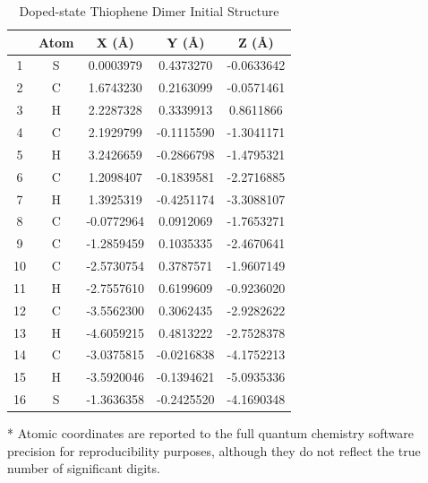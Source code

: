\begin{table}[hbt!]\centering
\caption{Doped-state Thiophene Dimer Initial Structure}
\renewcommand{\arraystretch}{1.5}
\begin{threeparttable}
\begin{tabular}{ccccc}\toprule
{} & {Atom} & {X (\AA)} & {Y (\AA)} & {Z (\AA)} \\ \midrule
  1 & S & 0.0003979 & 0.4373270 & -0.0633642\\
  2 & C & 1.6743230 & 0.2163099 & -0.0571461\\
  3 & H & 2.2287328 & 0.3339913 & 0.8611866\\
  4 & C & 2.1929799 & -0.1115590 & -1.3041171\\
  5 & H & 3.2426659 & -0.2866798 & -1.4795321\\
  6 & C & 1.2098407 & -0.1839581 & -2.2716885\\
  7 & H & 1.3925319 & -0.4251174 & -3.3088107\\
  8 & C & -0.0772964 & 0.0912069 & -1.7653271\\
  9 & C & -1.2859459 & 0.1035335 & -2.4670641\\
  10 & C & -2.5730754 & 0.3787571 & -1.9607149\\
  11 & H & -2.7557610 & 0.6199609 & -0.9236020\\
  12 & C & -3.5562300 & 0.3062435 & -2.9282622\\
  13 & H & -4.6059215 & 0.4813222 & -2.7528378\\
  14 & C & -3.0375815 & -0.0216838 & -4.1752213\\
  15 & H & -3.5920046 & -0.1394621 & -5.0935336\\
  16 & S & -1.3636358 & -0.2425520 & -4.1690348\\ \bottomrule
\end{tabular}
\begin{tablenotes}
\item[*] \footnotesize Atomic coordinates are reported to the full quantum chemistry software precision for reproducibility purposes, although they do not reflect the true number of significant digits.
\end{tablenotes}
\end{threeparttable}
\end{table}

